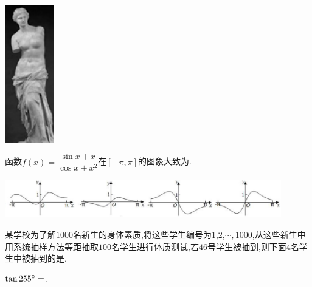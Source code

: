 \documentclass[windows,list]{BHCexam}
\begin{document}
\begin{groups}
\begin{questions}[]
\begin{minipage}{\linewidth}

\begin{center}
	\includegraphics[height=6cm]{./sSFh6W64bKcV715x2rYUVGCnqVea4NCO.png}
	\vspace{0.5cm}
\end{center}
\begin{solution}{4cm}

\end{solution}
\end{minipage}
\vfill
\begin{minipage}{\linewidth}
\question[5] 函数$f(x)= \dfrac {\sin x+x}{\cos x+x^{2}}$在$[- \pi  ,  \pi ]$的图象大致为.
\begin{center}
\includegraphics[width=12cm]{./F7UJfg6iYCiCefLftREhksYit6NP46Of.png}
\vspace{0.5cm}
\end{center}
\begin{solution}{4cm}

\end{solution}
\end{minipage}
\vfill
\begin{minipage}{\linewidth}
\question[5] 某学校为了解$1000$名新生的身体素质,将这些学生编号为$1$,$2$,$ \cdots, 1000$,从这些新生中用系统抽样方法等距抽取$100$名学生进行体质测试,若$46$号学生被抽到,则下面$4$名学生中被抽到的是. 


\begin{solution}{4cm}

\end{solution}
\end{minipage}
\vfill
\begin{minipage}{\linewidth}
\question[5] $\tan255^{\small \circ}=$.
\begin{solution}{4cm}


\end{solution}
\end{minipage}
\end{questions}
\end{groups}
\end{document}
